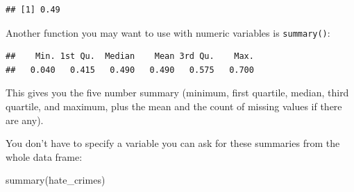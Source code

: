 \documentclass[
]{book}
\newenvironment{Shaded}{\begin{snugshade}}{\end{snugshade}}
\newcommand{\FunctionTok}[1]{\textcolor[rgb]{0.00,0.00,0.00}{#1}}
\newcommand{\NormalTok}[1]{#1}
\newcommand{\SpecialCharTok}[1]{\textcolor[rgb]{0.00,0.00,0.00}{#1}}
\begin{document}
\begin{Shaded}
\end{Shaded}

\begin{verbatim}
## [1] 0.49
\end{verbatim}

Another function you may want to use with numeric variables is \texttt{summary()}:

\begin{Shaded}
\end{Shaded}

\begin{verbatim}
##    Min. 1st Qu.  Median    Mean 3rd Qu.    Max. 
##   0.040   0.415   0.490   0.490   0.575   0.700
\end{verbatim}

This gives you the five number summary (minimum, first quartile, median, third quartile, and maximum, plus the mean and the count of missing values if there are any).

You don't have to specify a variable you can ask for these summaries from the whole data frame:

\begin{Shaded}
\begin{Highlighting}[]
\FunctionTok{summary}\NormalTok{(hate\_crimes)}
\end{Highlighting}
\end{Shaded}
\end{document}
